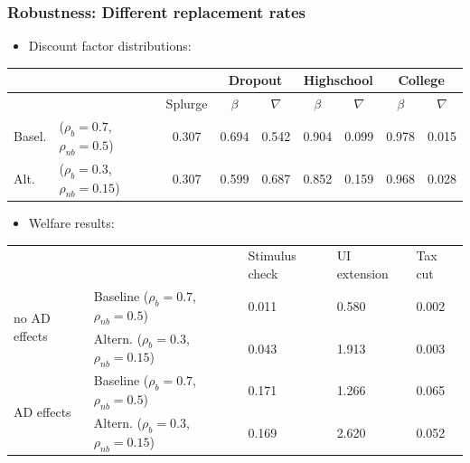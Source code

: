 \documentclass[pdflatex,aspectratio=169]{beamer}
\begin{document}
\begin{frame}
	\frametitle{Robustness: Different replacement rates}
	\centering  
	\small 
	
	\begin{itemize}
		\item Discount factor distributions: 
	\end{itemize}

	\begin{table}
		\begin{tabular}{llc|cccccc} 
			\toprule
			& & & \multicolumn{2}{c}{Dropout} & \multicolumn{2}{c}{Highschool} & \multicolumn{2}{c}{College} \\ \midrule 
			& & Splurge & $\beta$ & $\nabla$ & $\beta$ & $\nabla$ & $\beta$ & $\nabla$ \\ \midrule 
			Basel. & ($\rho_{b}=0.7$, $\rho_{nb}=0.5$) & 0.307 & 0.694 & 0.542 & 0.904 & 0.099 & 0.978 & 0.015 \\ 
			Alt. & ($\rho_{b}=0.3$,  $\rho_{nb}=0.15$) & 0.307 & 0.599 & 0.687 & 0.852 & 0.159 & 0.968 & 0.028
			\\ \bottomrule 
		\end{tabular}
	
	
	\begin{itemize}
		\item Welfare results: 
	\end{itemize}
		
		\begin{tabular}{@{}lllll@{}}
			\toprule
			&                    & Stimulus check & UI extension & Tax cut \\ \cmidrule(l){1-5} 
			\multirow{2}{*}{no AD effects} 	& Baseline  ($\rho_{b}=0.7$, $\rho_{nb}=0.5$) 		& 0.011          & 0.580        & 0.002   \\
			& Altern.  ($\rho_{b}=0.3$, $\rho_{nb}=0.15$) 	& 0.043          & 1.913        & 0.003   \\ \cmidrule(l){1-5} 
			\multirow{2}{*}{AD effects}		& Baseline  ($\rho_{b}=0.7$, $\rho_{nb}=0.5$)    	& 0.171          & 1.266        & 0.065   \\
			& Altern.  ($\rho_{b}=0.3$, $\rho_{nb}=0.15$)    & 0.169          & 2.620        & 0.052   \\ \cmidrule(l){1-5} 
		\end{tabular}
	\end{table}
\end{frame}
\end{document}
